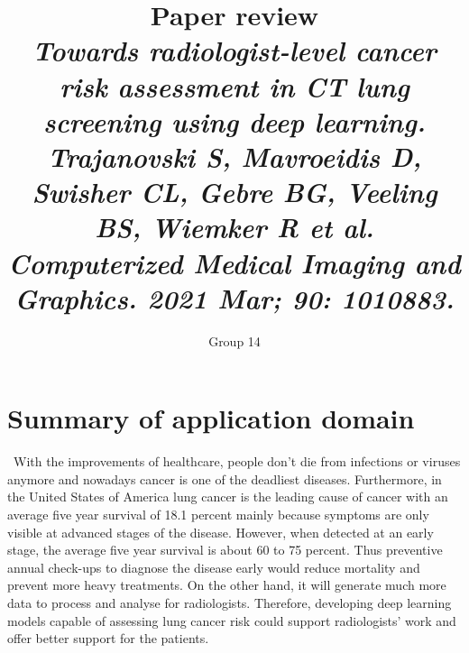 \documentclass{article}
\title{Paper review\\
\textit{Towards radiologist-level cancer risk assessment in CT lung screening using deep learning. Trajanovski S, Mavroeidis D, Swisher CL, Gebre BG, Veeling BS, Wiemker R et al. Computerized Medical Imaging and Graphics. 2021 Mar; 90: 1010883.}}
\author{Group 14}
\begin{document}
\maketitle

\section{Summary of application domain}\
With the improvements of healthcare, people don't die from infections or viruses anymore and nowadays cancer is one of the deadliest diseases. Furthermore, in the United States of America lung cancer is the leading cause of cancer with an average five year survival of 18.1 percent mainly because symptoms are only visible at advanced stages of the disease. However, when detected at an early stage, the average five year survival is about 60 to 75 percent. Thus preventive annual check-ups to diagnose the disease early would reduce mortality and prevent more heavy treatments. On the other hand, it will generate much more data to process and analyse for radiologists. Therefore, developing deep learning models capable of assessing lung cancer risk could support radiologists’ work and offer better support for the patients. 
\end{document}
